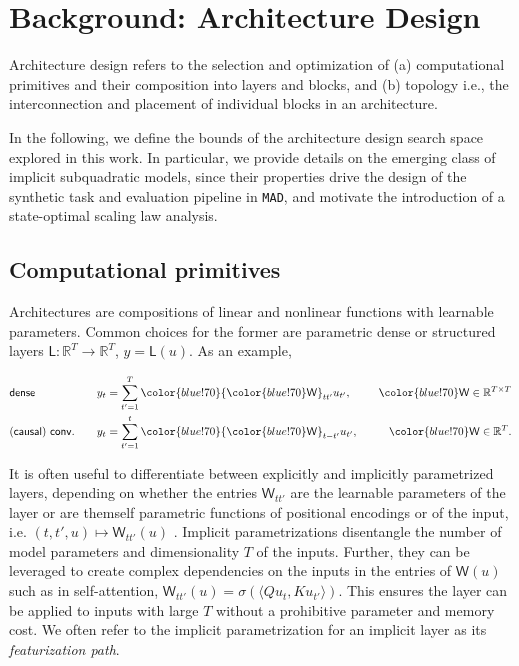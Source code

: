 \section{Background: Architecture Design}\label{sec:background}

Architecture design refers to the selection and optimization of (a) computational primitives and their composition into layers and blocks, and (b) topology i.e., the interconnection and placement of individual blocks in an architecture.

In the following, we define the bounds of the architecture design search space explored in this work. In particular, we provide details on the emerging class of implicit subquadratic models, since their properties drive the design of the synthetic task and evaluation pipeline in {\tt MAD}, and motivate the introduction of a state-optimal scaling law analysis.

\subsection{Computational primitives}

Architectures are compositions of linear and nonlinear functions with {\color{blue!70}learnable parameters}. Common choices for the former are parametric dense or structured layers ${\mathsf L}: \mathbb{R}^T \rightarrow \mathbb{R}^T$, $y = \mathsf{L}(u)$. As an example,

\[

\begin{aligned}
&{\sf dense}  \quad &y_t &= \sum_{t'=1}^{T} {\color{blue!70}{\color{blue!70}\mathsf{W}}_{t t'}}u_{t'}, \quad &{\color{blue!70}\mathsf{W}} \in \mathbb{R}^{T \times T} \\
&{\sf (causal)~ conv.} \quad &y_t &= \sum_{t'=1}^{t} {\color{blue!70}{\color{blue!70}\mathsf{W}}_{t - t'}}u_{t'}, \quad &{\color{blue!70}\mathsf{W}} \in \mathbb{R}^{T}.\\
\end{aligned}

\]

It is often useful to differentiate between explicitly and implicitly parametrized layers, depending on whether the entries $\mathsf{W}_{tt'}$ are the learnable parameters of the layer or are themself parametric functions of positional encodings or of the input, i.e. $(t,t',u)\mapsto \mathsf{W}_{tt'}(u)$ \cite{poli2023hyena}. Implicit parametrizations disentangle the number of model parameters and dimensionality $T$ of the inputs. Further, they can be leveraged to create complex dependencies on the inputs in the entries of $\mathsf{W}(u)$ such as in self-attention, $\mathsf{W}_{tt'}(u) = \sigma(\langle Qu_t,Ku_{t'}\rangle)$. This ensures the layer can be applied to inputs with large $T$ without a prohibitive parameter and memory cost. We often refer to the implicit parametrization for an implicit layer as its \textit{featurization path}.

